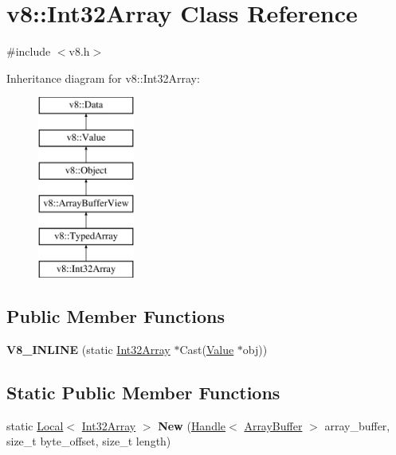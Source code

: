 \hypertarget{classv8_1_1_int32_array}{}\section{v8\+:\+:Int32\+Array Class Reference}
\label{classv8_1_1_int32_array}


{\ttfamily \#include $<$v8.\+h$>$}

Inheritance diagram for v8\+:\+:Int32\+Array\+:\begin{figure}[H]
\begin{center}
\leavevmode
\includegraphics[height=6.000000cm]{classv8_1_1_int32_array}
\end{center}
\end{figure}
\subsection*{Public Member Functions}
\begin{DoxyCompactItemize}
\item 
\hypertarget{classv8_1_1_int32_array_a4b9ec8339bc592ed0216e5c980b570ed}{}{\bfseries V8\+\_\+\+I\+N\+L\+I\+N\+E} (static \hyperlink{classv8_1_1_int32_array}{Int32\+Array} $\ast$Cast(\hyperlink{classv8_1_1_value}{Value} $\ast$obj))\label{classv8_1_1_int32_array_a4b9ec8339bc592ed0216e5c980b570ed}

\end{DoxyCompactItemize}
\subsection*{Static Public Member Functions}
\begin{DoxyCompactItemize}
\item 
\hypertarget{classv8_1_1_int32_array_a41fa255626b8e00e9cc9f5d4e0c518d5}{}static \hyperlink{classv8_1_1_local}{Local}$<$ \hyperlink{classv8_1_1_int32_array}{Int32\+Array} $>$ {\bfseries New} (\hyperlink{classv8_1_1_handle}{Handle}$<$ \hyperlink{classv8_1_1_array_buffer}{Array\+Buffer} $>$ array\+\_\+buffer, size\+\_\+t byte\+\_\+offset, size\+\_\+t length)\label{classv8_1_1_int32_array_a41fa255626b8e00e9cc9f5d4e0c518d5}

\end{DoxyCompactItemize}

